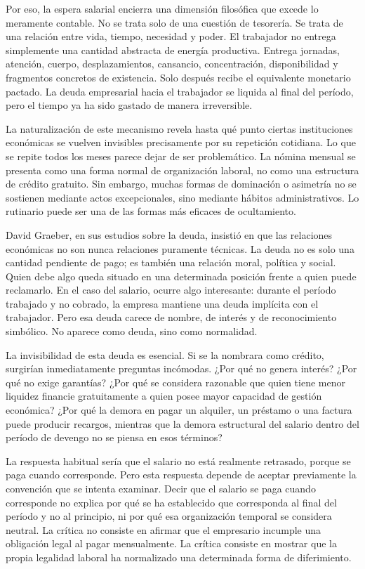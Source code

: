 \documentclass[12pt,a4paper]{article}
\begin{document}
Por eso, la espera salarial encierra una dimensión filosófica que excede lo meramente contable. No se trata solo de una cuestión de tesorería. Se trata de una relación entre vida, tiempo, necesidad y poder. El trabajador no entrega simplemente una cantidad abstracta de energía productiva. Entrega jornadas, atención, cuerpo, desplazamientos, cansancio, concentración, disponibilidad y fragmentos concretos de existencia. Solo después recibe el equivalente monetario pactado. La deuda empresarial hacia el trabajador se liquida al final del período, pero el tiempo ya ha sido gastado de manera irreversible.

La naturalización de este mecanismo revela hasta qué punto ciertas instituciones económicas se vuelven invisibles precisamente por su repetición cotidiana. Lo que se repite todos los meses parece dejar de ser problemático. La nómina mensual se presenta como una forma normal de organización laboral, no como una estructura de crédito gratuito. Sin embargo, muchas formas de dominación o asimetría no se sostienen mediante actos excepcionales, sino mediante hábitos administrativos. Lo rutinario puede ser una de las formas más eficaces de ocultamiento.

David Graeber, en sus estudios sobre la deuda, insistió en que las relaciones económicas no son nunca relaciones puramente técnicas. La deuda no es solo una cantidad pendiente de pago; es también una relación moral, política y social. Quien debe algo queda situado en una determinada posición frente a quien puede reclamarlo. En el caso del salario, ocurre algo interesante: durante el período trabajado y no cobrado, la empresa mantiene una deuda implícita con el trabajador. Pero esa deuda carece de nombre, de interés y de reconocimiento simbólico. No aparece como deuda, sino como normalidad.

La invisibilidad de esta deuda es esencial. Si se la nombrara como crédito, surgirían inmediatamente preguntas incómodas. ¿Por qué no genera interés? ¿Por qué no exige garantías? ¿Por qué se considera razonable que quien tiene menor liquidez financie gratuitamente a quien posee mayor capacidad de gestión económica? ¿Por qué la demora en pagar un alquiler, un préstamo o una factura puede producir recargos, mientras que la demora estructural del salario dentro del período de devengo no se piensa en esos términos?

La respuesta habitual sería que el salario no está realmente retrasado, porque se paga cuando corresponde. Pero esta respuesta depende de aceptar previamente la convención que se intenta examinar. Decir que el salario se paga cuando corresponde no explica por qué se ha establecido que corresponda al final del período y no al principio, ni por qué esa organización temporal se considera neutral. La crítica no consiste en afirmar que el empresario incumple una obligación legal al pagar mensualmente. La crítica consiste en mostrar que la propia legalidad laboral ha normalizado una determinada forma de diferimiento.
\end{document}
